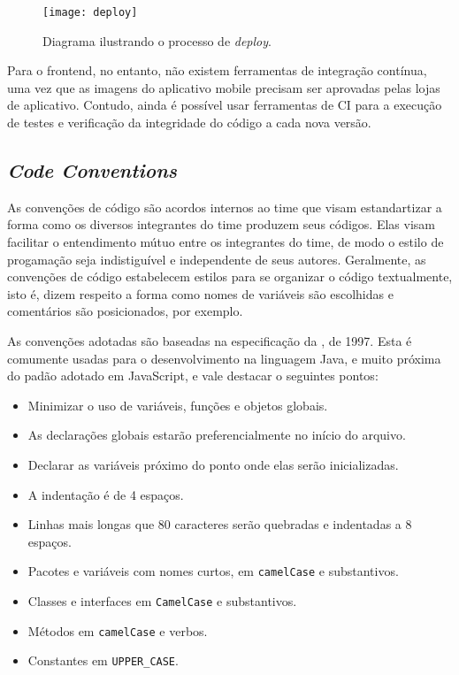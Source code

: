 \begin{figure}
  \centering
  \caption{Diagrama ilustrando o processo de \emph{deploy}.}
  \texttt{[image: deploy]}
  \label{fig:jenkins}
\end{figure}

Para o \gls{frontend}, no entanto, não existem ferramentas de
integração contínua, uma vez que as imagens do aplicativo mobile
precisam ser aprovadas pelas lojas de aplicativo. Contudo, ainda é
possível usar ferramentas de CI para a execução de testes e
verificação da integridade do código a cada nova versão.

\subsection{\emph{Code Conventions}}

As convenções de código são acordos internos ao time que visam
estandartizar a forma como os diversos integrantes do time produzem
seus códigos.  Elas visam facilitar o entendimento mútuo entre os
integrantes do time, de modo o estilo de progamação seja indistiguível
e independente de seus autores.  Geralmente, as convenções de código
estabelecem estilos para se organizar o código textualmente, isto é,
dizem respeito a forma como nomes de variáveis são escolhidas e
comentários são posicionados, por exemplo.

As convenções adotadas são baseadas na especificação da
\citeauthor{Oracle1997}, de 1997. Esta é comumente usadas para o
desenvolvimento na linguagem Java, e muito próxima do padão adotado em
JavaScript, e vale destacar o seguintes pontos:
\begin{itemize}
\item Minimizar o uso de variáveis, funções e objetos globais.
\item As declarações globais estarão preferencialmente no início do arquivo.
\item Declarar as variáveis próximo do ponto onde elas serão inicializadas.
\item A indentação é de 4 espaços.
\item Linhas mais longas que 80 caracteres serão quebradas e
  indentadas a 8 espaços.
\item Pacotes e variáveis com nomes curtos, em \texttt{camelCase} e substantivos.
\item Classes e interfaces em \texttt{CamelCase} e substantivos.
\item Métodos em \texttt{camelCase} e verbos.
\item Constantes em \texttt{UPPER\_CASE}.
\end{itemize}


